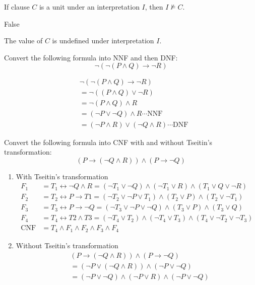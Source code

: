 \documentclass[11pt,a4paper]{article}
\newcommand{\lequiv}{\leftrightarrow}
\begin{document}
\subproblem If clause $C$ is a unit under an interpretation $I$, then $I \not\models C$.

\begin{solution}
    False
    
    The value of $C$ is undefined under interpretation $I$.
\end{solution}

\newpage
{}

\subproblem Convert the following formula into NNF and then DNF:
$$\lnot(\lnot(P \land Q) \to \lnot R)$$

\begin{solution}
	\begin{align*}
    & \lnot(\lnot(P \land Q) \to \lnot R) \\
    &= \lnot((P \land Q) \lor \lnot R) \\
    &= \lnot(P \land Q) \land R \\
    &= (\lnot P \lor \lnot Q) \land R \cdots \text{NNF} \\
    &= (\lnot P \land R) \lor (\lnot Q \land R) \cdots \text{DNF}
    \end{align*}
\end{solution}

\subproblem Convert the following formula into CNF with and without Tseitin's transformation:
$$(P \to (\lnot Q \land R)) \land (P \to \lnot Q)$$

\begin{solution}
	\begin{enumerate}
		\item With Tseitin's transformation
			\begin{align*}
			F_1 &= T_1 \lequiv \lnot Q \land R = (\lnot T_1 \lor \lnot Q) \land (\lnot T_1 \lor R) \land (T_1 \lor Q \lor \lnot R) \\
			F_2 &= T_2 \lequiv P \to T1 = (\lnot T_2 \lor \lnot P \lor T_1) \land (T_2 \lor P) \land (T_2 \lor \lnot T_1) \\
			F_3 &= T_3 \lequiv P \to \lnot Q = (\lnot T_3 \lor \lnot P \lor \lnot Q) \land (T_3 \lor P) \land (T_3 \lor Q) \\
			F_4 &= T_4 \lequiv T2 \land T3 = (\lnot T_4 \lor T_2) \land (\lnot T_4 \lor T_3) \land (T_4 \lor \lnot T_2 \lor \lnot T_3) \\
			\text{CNF} &= T_4 \land F_1 \land F_2 \land F_3 \land F_4
			\end{align*}
		\item Without Tseitin's transformation
			\begin{align*}
			& (P \to (\lnot Q \land R)) \land (P \to \lnot Q) \\
			&= (\lnot P \lor (\lnot Q \land R)) \land (\lnot P \lor \lnot Q) \\
			&= (\lnot P \lor \lnot Q) \land (\lnot P \lor R) \land (\lnot P \lor \lnot Q) \\
			\end{align*}
	\end{enumerate}
\end{solution}
\end{document}
